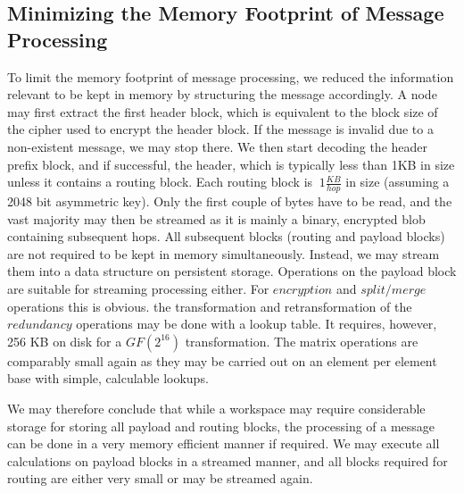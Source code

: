 \subsection{Minimizing the Memory Footprint of Message Processing}
To limit the memory footprint of message processing, we reduced the information relevant to be kept in memory by structuring the message accordingly. A node may first extract the first header block, which is equivalent to the block size of the cipher used to encrypt the header block. If the message is invalid due to a non-existent message, we may stop there. We then start decoding the header prefix block, and if successful, the header, which is typically less than 1KB in size unless it contains a routing block. Each routing block is $~1 \frac{KB}{hop}$ in size (assuming a 2048 bit asymmetric key). Only the first couple of bytes have to be read, and the vast majority may then be streamed as it is mainly a binary, encrypted blob containing subsequent hops. All subsequent blocks (routing and payload blocks) are not required to be kept in memory simultaneously. Instead, we may stream them into a data structure on persistent storage. Operations on the payload block are suitable for streaming processing either. For $encryption$ and $split/merge$ operations this is obvious. the transformation and retransformation of the $redundancy$ operations may be done with a lookup table. It requires, however, 256 KB on disk for a $GF(2^{16})$ transformation. The matrix operations are comparably small again as they may be carried out on an element per element base with simple, calculable lookups. 

We may therefore conclude that while a workspace may require considerable storage for storing all payload and routing blocks, the processing of a message can be done in a very memory efficient manner if required. We may execute all calculations on payload blocks in a streamed manner, and all blocks required for routing are either very small or may be streamed again.





